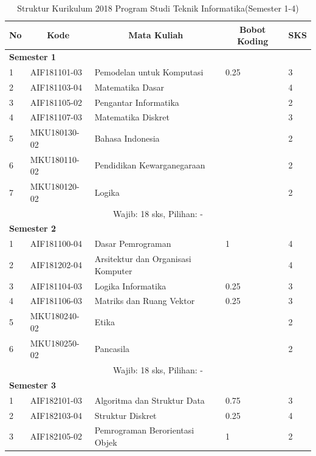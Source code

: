 \begin{table}[H]
	\centering
		\caption{Struktur Kurikulum 2018 Program Studi Teknik Informatika(Semester 1-4)}
		\begin{tabular}{|p{0.5cm}|p{2.85cm}|p{4.95cm}|p{2.7cm}|p{2.7cm}|}
			\hline
			\multicolumn{1}{|c|}{\textbf{No}} & \multicolumn{1}{c|}{\textbf{Kode}} & \multicolumn{1}{c|}{\textbf{Mata Kuliah}} & \multicolumn{1}{c|}{\textbf{Bobot Koding}} & \multicolumn{1}{c|}{\textbf{SKS}} \\ \hline
			\multicolumn{5}{|l|}{\textbf{Semester 1}} \\ \hline
			1 &	AIF181101-03 &	Pemodelan untuk Komputasi &	0.25 &	3   \\ \hline
			2 &	AIF181103-04 &	Matematika Dasar &	&	4  \\ \hline
			3 &	AIF181105-02 &	Pengantar Informatika &  & 2  \\ \hline
			4	& AIF181107-03 &	Matematika Diskret &	&	3  \\ \hline
			5	& MKU180130-02 &	Bahasa Indonesia &	&	2  \\ \hline
			6	& MKU180110-02 &	Pendidikan Kewarganegaraan &	&	2  \\ \hline
			7	& MKU180120-02 &	Logika &	&	2  \\ \hline
			\multicolumn{5}{|c|}{Wajib: 18 sks, Pilihan: -} \\ \hline
			\multicolumn{5}{|l|}{\textbf{Semester 2}} \\ \hline
			1 &	AIF181100-04 &	Dasar Pemrograman &	1 &	4 \\ \hline
			2 &	AIF181202-04 &	Arsitektur dan Organisasi Komputer & &	4  \\ \hline
			3 &	AIF181104-03 &	Logika Informatika &	0.25 &	3  \\ \hline
			4 &	AIF181106-03 &	Matriks dan Ruang Vektor &	0.25 &	3  \\ \hline
			5 &	MKU180240-02 &	Etika	& &	2  \\ \hline
			6 &	MKU180250-02 &	Pancasila & &	2  \\ \hline
			\multicolumn{5}{|c|}{Wajib: 18 sks, Pilihan: - }\\ \hline
			\multicolumn{5}{|l|}{\textbf{Semester 3}} \\ \hline
			1 &	AIF182101-03 &	Algoritma dan Struktur Data &	0.75 &	3  \\ \hline
			2 &	AIF182103-04 &	Struktur Diskret &	0.25 &	4  \\ \hline
			3 &	AIF182105-02 &	Pemrograman Berorientasi Objek &	1 &	2   \\ \hline

\end{tabular}
\end{table}
